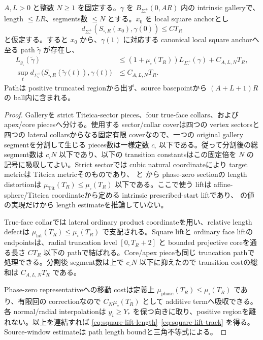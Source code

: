 \documentclass[11pt,a4paper]{ltjsarticle}
\newcommand{\Sigplus}{\Sigma_{\square}^{+}}
\newcommand{\gsq}{g_{\square}}\newcommand{\omsq}{\omega_{\square}}
\theoremstyle{plain}
\theoremstyle{definition}
\theoremstyle{remark}
\begin{document}
\begin{proposition}\label{prop:square-quantitative-lift}
$A,L>0$ と整数 $N\ge1$ を固定する。$\gamma$ を $B_{\Sigplus}(0,AR)$ 内の intrinsic galleryで、length $\le LR$、segments数 $\le N$ とする。$x_0$ を local square anchorとし
\[
 d_{\Sigplus}(S_{\square,R}(x_0),\gamma(0))\le C T_R
\]
と仮定する。すると $x_0$ から、$\gamma(1)$ に対応する canonical local square anchorへ至る path $\widetilde\gamma$ が存在し、
\begin{align}
 L_{\gsq}(\widetilde\gamma)
 &\le (1+\mu_\square(T_R))L_{\Sigplus}(\gamma)+C_{A,L,N}T_R,\label{eq:square-lift-length}\\
 \sup_t d_{\Sigplus}\bigl(S_{\square,R}(\widetilde\gamma(t)),\gamma(t)\bigr)
 &\le C_{A,L,N}T_R.\label{eq:square-lift-track}
\end{align}
Pathは positive truncated regionから出ず、source basepointから $(A+L+1)R$ の ball内に含まれる。
\end{proposition}

\begin{proof}
Galleryを strict Titeica-sector pieces、four true-face collars、および apex/core piecesへ分ける。使用する sector/collar coverは四つの vertex sectorsと四つの lateral collarsからなる固定有限 coverなので、一つの original gallery segmentを分割して生じる pieces数は一様定数 $c_\square$ 以下である。従って分割後の総 segment数は $c_\square N$ 以下であり、以下の transition constantsはこの固定倍を $N$ の記号に吸収してよい。Strict sectorでは cubic natural coordinateにより target metricは Titeica metricそのものであり、 と  から phase-zero sectionの length distortionは $\mu_{\mathrm{Tit}}(T_R)\le\mu_\square(T_R)$ 以下である。ここで使う liftは affine-sphere/Titeica coordinateから定める intrinsic prescribed-start liftであり、 の値の実現だけから length estimateを推論していない。

True-face collarでは lateral ordinary product coordinateを用い、relative length defectは $\mu_{\mathrm{lat}}(T_R)\le\mu_\square(T_R)$ で支配される。Square liftと ordinary face liftの endpointsは、radial truncation level $[0,T_R+2]$ と bounded projective coreを通る長さ $CT_R$ 以下の pathで結ばれる。Core/apex pieceも同じ truncation pathで処理できる。分割後 segment数は上で $c_\square N$ 以下に抑えたので transition costの総和は $C_{A,L,N}T_R$ である。

Phase-zero representativeへの移動 costは定義上 $\mu_{\mathrm{phase}}(T_R)\le\mu_\square(T_R)$ であり、有限回の correctionなので $C_N\mu_\square(T_R)$ として additive termへ吸収できる。各 normal/radial interpolationは $y_i\ge Y_*$ を保つ向きに取り、positive regionを離れない。以上を連結すれば \eqref{eq:square-lift-length}--\eqref{eq:square-lift-track} を得る。Source-window estimateは path length boundと三角不等式による。
\end{proof}
\end{document}
